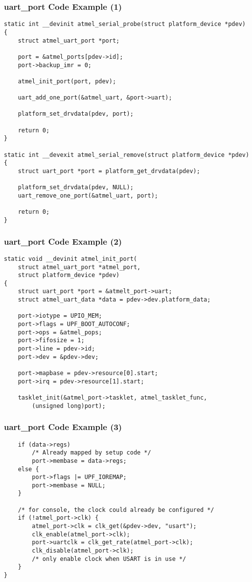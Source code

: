 \begin{frame}[fragile]
  \frametitle{uart\_port Code Example (1)}
\begin{verbatim}
static int __devinit atmel_serial_probe(struct platform_device *pdev)
{
    struct atmel_uart_port *port;

    port = &atmel_ports[pdev->id];
    port->backup_imr = 0;

    atmel_init_port(port, pdev);

    uart_add_one_port(&atmel_uart, &port->uart);

    platform_set_drvdata(pdev, port);

    return 0;
}

static int __devexit atmel_serial_remove(struct platform_device *pdev)
{
    struct uart_port *port = platform_get_drvdata(pdev);

    platform_set_drvdata(pdev, NULL);
    uart_remove_one_port(&atmel_uart, port);

    return 0;
}
\end{verbatim}
\end{frame}

\begin{frame}[fragile]
\frametitle{uart\_port Code Example (2)}
\begin{verbatim}
static void __devinit atmel_init_port(
    struct atmel_uart_port *atmel_port,
    struct platform_device *pdev)
{
    struct uart_port *port = &atmelt_port->uart;
    struct atmel_uart_data *data = pdev->dev.platform_data;

    port->iotype = UPIO_MEM;
    port->flags = UPF_BOOT_AUTOCONF;
    port->ops = &atmel_pops;
    port->fifosize = 1;
    port->line = pdev->id;
    port->dev = &pdev->dev;

    port->mapbase = pdev->resource[0].start;
    port->irq = pdev->resource[1].start;

    tasklet_init(&atmel_port->tasklet, atmel_tasklet_func,
        (unsigned long)port);

\end{verbatim}
\end{frame}

\begin{frame}[fragile]
\frametitle{uart\_port Code Example (3)}
\begin{verbatim}
    if (data->regs)
        /* Already mapped by setup code */
        port->membase = data->regs;
    else {
        port->flags |= UPF_IOREMAP;
        port->membase = NULL;
    }

    /* for console, the clock could already be configured */
    if (!atmel_port->clk) {
        atmel_port->clk = clk_get(&pdev->dev, "usart");
        clk_enable(atmel_port->clk);
        port->uartclk = clk_get_rate(atmel_port->clk);
        clk_disable(atmel_port->clk);
        /* only enable clock when USART is in use */
    }
}
\end{verbatim}
\end{frame}


